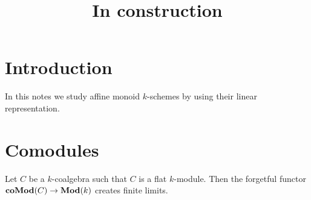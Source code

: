 



\title{In construction}
\date{}
\maketitle

\section{Introduction}
\noindent
In this notes we study affine monoid $k$-schemes by using their linear representation.


\section{Comodules}
\begin{theorem}\label{theorem:limits_creation_forgetful_from_coalgebras_to_modules}
Let $C$ be a $k$-coalgebra such that $C$ is a flat $k$-module. Then the forgetful functor $\mathbf{coMod}(C)\rightarrow \mathbf{Mod}(k)$ creates finite limits.
\end{theorem}
